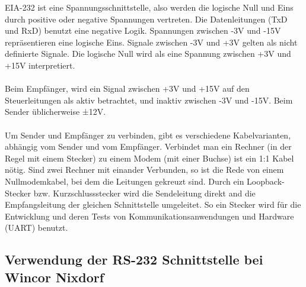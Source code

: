 EIA-232 ist eine Spannungsschnittstelle, also werden die logische Null und Eins durch positive oder negative Spannungen vertreten. Die Datenleitungen (TxD und RxD) benutzt eine negative Logik. Spannungen zwischen -3V und -15V repräsentieren eine logische Eins. Signale zwischen -3V und +3V gelten als nicht definierte Signale. Die logische Null wird als eine Spannung zwischen +3V und +15V interpretiert.
\\\\
Beim Empfänger, wird ein Signal zwischen +3V und +15V auf den Steuerleitungen als aktiv betrachtet, und inaktiv zwischen -3V und -15V. Beim Sender üblicherweise ±12V.
\\\\
Um Sender und Empfänger zu verbinden, gibt es verschiedene Kabelvarianten, abhängig vom Sender und vom Empfänger. Verbindet man ein Rechner (in der Regel mit einem Stecker) zu einem Modem (mit einer Buchse) ist ein 1:1 Kabel nötig. Sind zwei Rechner mit einander Verbunden, so ist die Rede von einem Nullmodemkabel, bei dem die Leitungen gekreuzt sind. Durch ein Loopback-Stecker bzw. Kurzschlussstecker wird die Sendeleitung direkt and die Empfangsleitung der gleichen Schnittstelle umgeleitet. So ein Stecker wird für die Entwicklung und deren Tests von Kommunikationsanwendungen und Hardware (UART) benutzt.


\subsection{Verwendung der RS-232 Schnittstelle bei Wincor Nixdorf}
